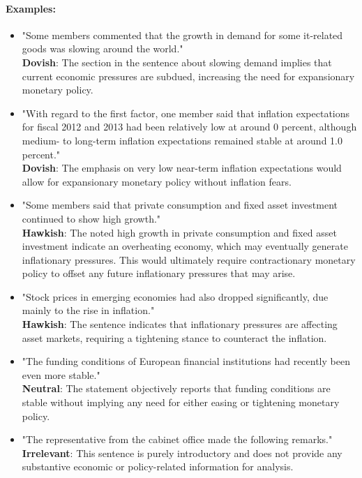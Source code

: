 \paragraph{Examples: }
\begin{itemize}
    \item "Some members commented that the growth in demand for some it-related goods was slowing around the world."\\
    \textbf{Dovish}: The section in the sentence about slowing demand implies that current economic pressures are subdued, increasing the need for expansionary monetary policy.
    
    \item "With regard to the first factor, one member said that inflation expectations for fiscal 2012 and 2013 had been relatively low at around 0 percent, although medium- to long-term inflation expectations remained stable at around 1.0 percent."\\
    \textbf{Dovish}: The emphasis on very low near-term inflation expectations would allow for expansionary monetary policy without inflation fears.
    
    \item "Some members said that private consumption and fixed asset investment continued to show high growth."\\
    \textbf{Hawkish}: The noted high growth in private consumption and fixed asset investment indicate an overheating economy, which may eventually generate inflationary pressures. This would ultimately require contractionary monetary policy to offset any future inflationary pressures that may arise.
    
    \item "Stock prices in emerging economies had also dropped significantly, due mainly to the rise in inflation."\\
    \textbf{Hawkish}: The sentence indicates that inflationary pressures are affecting asset markets, requiring a tightening stance to counteract the inflation.
    
    \item "The funding conditions of European financial institutions had recently been even more stable."\\
    \textbf{Neutral}: The statement objectively reports that funding conditions are stable without implying any need for either easing or tightening monetary policy.
    
    \item "The representative from the cabinet office made the following remarks."\\
    \textbf{Irrelevant}: This sentence is purely introductory and does not provide any substantive economic or policy-related information for analysis.
\end{itemize}



